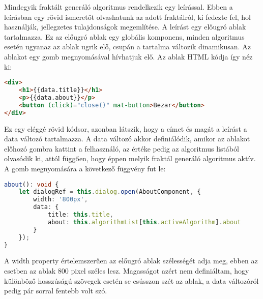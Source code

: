 Mindegyik fraktált generáló algoritmus rendelkezik egy leírással. Ebben a leírásban egy rövid ismeretőt olvashatunk az adott fraktálról, ki fedezte fel, hol használják, jellegzetes tulajdonságok megemlítése. A leírást egy előugró ablak tartalmazza. Ez az előugró ablak egy globális komponens, minden algoritmus esetén ugyanaz az ablak ugrik elő, csupán a tartalma változik dinamikusan. Az ablakot egy gomb megnyomásával hívhatjuk elő. Az ablak HTML kódja így néz ki:
\begin{lstlisting}[language=html]
<div>
	<h1>{{data.title}}</h1>
	<p>{{data.about}}</p>
	<button (click)="close()" mat-button>Bezar</button>
</div>
\end{lstlisting}
Ez egy eléggé rövid kódsor, azonban látszik, hogy a címet és magát a leírást a data változó tartalmazza. A data változó akkor definiálódik, amikor az ablakot előhozó gombra kattint a felhasználó, az értéke pedig az algoritmus listából olvasódik ki, attól függően, hogy éppen melyik fraktál generáló algoritmus aktív. A gomb megnyomására a következő függvény fut le:
\begin{lstlisting}[language=typescript]
about(): void {
	let dialogRef = this.dialog.open(AboutComponent, {
		width: '800px',
		data: {
			title: this.title,
			about: this.algorithmList[this.activeAlgorithm].about
		}
	});
}
\end{lstlisting}
A width property értelemszerűen az előugró ablak szélességét adja meg, ebben az esetben az ablak 800 pixel széles lesz. Magasságot azért nem definiáltam, hogy különböző hosszúságú szövegek esetén se csússzon szét az ablak, a data változóról pedig pár sorral fentebb volt szó.